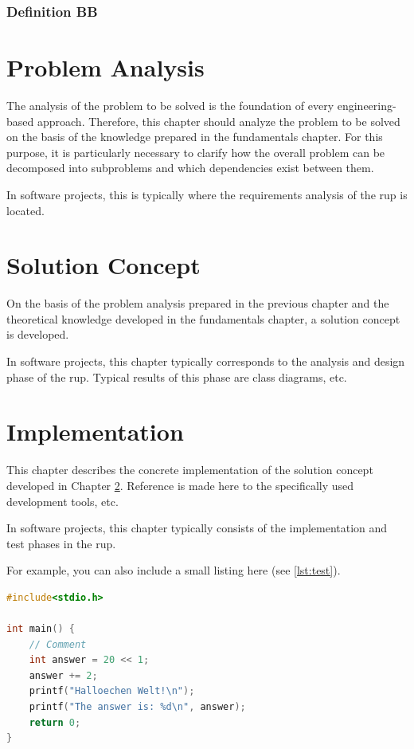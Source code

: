 \documentclass[oneside]{ausarbeitung}
\begin{document}
\subsection{Definition BB}
\label{sub:definitionbb}

\blindtext

\chapter{Problem Analysis}
\label{cha:problemanalyse}

The analysis of the problem to be solved is the foundation of every
engineering-based approach. Therefore, this chapter should analyze the
problem to be solved on the basis of the knowledge prepared in the fundamentals chapter.
For this purpose, it is particularly necessary to clarify how
the overall problem can be decomposed into subproblems and which
dependencies exist between them.

In software projects, this is typically where the
requirements analysis of the \ac{rup} is located.

\chapter{Solution Concept}
\label{cha:loesungskonzept}

On the basis of the problem analysis prepared in the previous chapter
and the theoretical knowledge developed in the fundamentals chapter,
a solution concept is developed.

In software projects, this chapter typically corresponds to the
analysis and design phase of the \ac{rup}. Typical results of this phase are
class diagrams, etc.

\chapter{Implementation}
\label{cha:implementierung}

This chapter describes the concrete implementation of the solution concept
developed in Chapter \ref{cha:loesungskonzept}.
Reference is made here to the specifically used development tools, etc.

In software projects, this chapter typically consists of the
implementation and test phases in the \ac{rup}.

For example, you can also include a small listing here (see \ref{lst:test}).

\begin{lstlisting}[language=c,%
                   caption={Heading of the Source Code},label=lst:test]
#include<stdio.h>

int main() {
    // Comment
    int answer = 20 << 1;
    answer += 2;
    printf("Halloechen Welt!\n");
    printf("The answer is: %d\n", answer);
    return 0;
}
\end{lstlisting}
\end{document}
